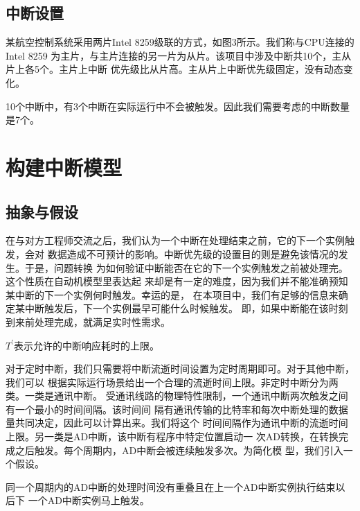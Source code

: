 \subsection{中断设置}
\label{subsec:intr_setting}

某航空控制系统采用两片Intel 8259级联的方式，如图3所示。我们称与CPU连接的Intel 8259
为主片，与主片连接的另一片为从片。该项目中涉及中断共10个，主从片上各5个。主片上中断
优先级比从片高。主从片上中断优先级固定，没有动态变化。

10个中断中，有3个中断在实际运行中不会被触发。因此我们需要考虑的中断数量是7个。

\section{构建中断模型}
\label{sec:build}

\subsection{抽象与假设}
\label{subsec:abstract_ass}

在与对方工程师交流之后，我们认为一个中断在处理结束之前，它的下一个实例触发，会对
数据造成不可预计的影响。中断优先级的设置目的则是避免该情况的发生。于是，问题转换
为如何验证中断能否在它的下一个实例触发之前被处理完。这个性质在自动机模型里表达起
来却是有一定的难度，因为我们并不能准确预知某中断的下一个实例何时触发。幸运的是，
在本项目中，我们有足够的信息来确定某中断触发后，下一个实例最早可能什么时候触发。
即，如果中断能在该时刻到来前处理完成，就满足实时性需求。

\begin{definition}
	$T^\prime$表示允许的中断响应耗时的上限。
	\label{def:T_prime}
\end{definition}

对于定时中断，我们只需要将中断流逝时间设置为定时周期即可。对于其他中断，我们可以
根据实际运行场景给出一个合理的流逝时间上限。非定时中断分为两类。一类是通讯中断。
受通讯线路的物理特性限制，一个通讯中断两次触发之间有一个最小的时间间隔。该时间间
隔有通讯传输的比特率和每次中断处理的数据量共同决定，因此可以计算出来。我们将这个
时间间隔作为通讯中断的流逝时间上限。另一类是AD中断，该中断有程序中特定位置启动一
次AD转换，在转换完成之后触发。每个周期内，AD中断会被连续触发多次。为简化模
型，我们引入一个假设。

\begin{assumption}
	同一个周期内的AD中断的处理时间没有重叠且在上一个AD中断实例执行结束以后下
	一个AD中断实例马上触发。
	\label{assume:ad}
\end{assumption}

